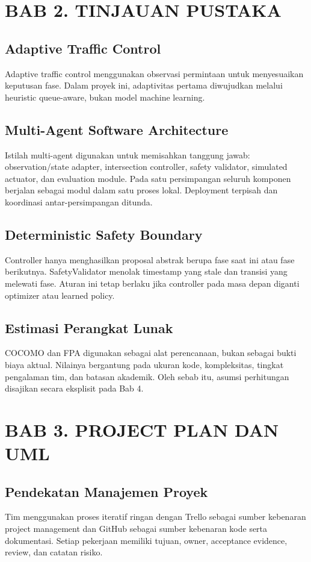 \documentclass[12pt]{article}
\begin{document}
\section{BAB 2. TINJAUAN PUSTAKA}
\subsection{Adaptive Traffic Control}
Adaptive traffic control menggunakan observasi permintaan untuk menyesuaikan keputusan fase. Dalam proyek ini, adaptivitas pertama diwujudkan melalui heuristic queue-aware, bukan model machine learning.

\subsection{Multi-Agent Software Architecture}
Istilah multi-agent digunakan untuk memisahkan tanggung jawab: observation/state adapter, intersection controller, safety validator, simulated actuator, dan evaluation module. Pada satu persimpangan seluruh komponen berjalan sebagai modul dalam satu proses lokal. Deployment terpisah dan koordinasi antar-persimpangan ditunda.

\subsection{Deterministic Safety Boundary}
Controller hanya menghasilkan proposal abstrak berupa fase saat ini atau fase berikutnya. SafetyValidator menolak timestamp yang stale dan transisi yang melewati fase. Aturan ini tetap berlaku jika controller pada masa depan diganti optimizer atau learned policy.

\subsection{Estimasi Perangkat Lunak}
COCOMO dan FPA digunakan sebagai alat perencanaan, bukan sebagai bukti biaya aktual. Nilainya bergantung pada ukuran kode, kompleksitas, tingkat pengalaman tim, dan batasan akademik. Oleh sebab itu, asumsi perhitungan disajikan secara eksplisit pada Bab 4.

\section{BAB 3. PROJECT PLAN DAN UML}
\subsection{Pendekatan Manajemen Proyek}
Tim menggunakan proses iteratif ringan dengan Trello sebagai sumber kebenaran project management dan GitHub sebagai sumber kebenaran kode serta dokumentasi. Setiap pekerjaan memiliki tujuan, owner, acceptance evidence, review, dan catatan risiko.
\end{document}
